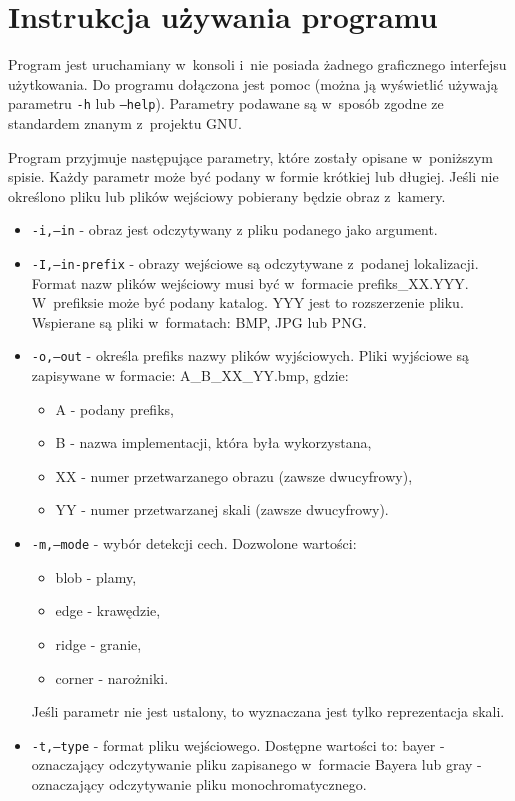 \chapter{Instrukcja używania programu}
\label{cha:instrukcja}

Program jest uruchamiany w~konsoli i~nie posiada żadnego graficznego interfejsu użytkowania. Do programu dołączona jest pomoc (można ją wyświetlić używają parametru \texttt{-h} lub \texttt{--help}). Parametry podawane są w~sposób zgodne ze standardem znanym z~projektu GNU.

Program przyjmuje następujące parametry, które zostały opisane w~poniższym spisie. Każdy parametr może być podany w formie krótkiej lub długiej. Jeśli nie określono pliku lub plików wejściowy pobierany będzie obraz z~kamery.

\begin{itemize}
\item \texttt{-i,--in} - obraz jest odczytywany z pliku podanego jako argument.
\item \texttt{-I,--in-prefix} - obrazy wejściowe są odczytywane z~podanej lokalizacji. Format nazw plików wejściowy musi być w~formacie prefiks\_XX.YYY. W~prefiksie może być podany katalog. YYY jest to rozszerzenie pliku. Wspierane są pliki w~formatach: BMP, JPG lub PNG.
\item \texttt{-o,--out} - określa prefiks nazwy plików wyjściowych. Pliki wyjściowe są zapisywane w formacie: A\_B\_XX\_YY.bmp, gdzie:
	\begin{itemize}
		\item A - podany prefiks,
		\item B - nazwa implementacji, która była wykorzystana,
		\item XX - numer przetwarzanego obrazu (zawsze dwucyfrowy),
		\item YY - numer przetwarzanej skali (zawsze dwucyfrowy).
	\end{itemize}
\item \texttt{-m,--mode} - wybór detekcji cech. Dozwolone wartości:
	\begin{itemize}
		\item blob - plamy,
		\item edge - krawędzie,
		\item ridge - granie,
		\item corner - narożniki.
	\end{itemize}
	Jeśli parametr nie jest ustalony, to wyznaczana jest tylko reprezentacja skali.
\item \texttt{-t,--type} - format pliku wejściowego. Dostępne wartości to: bayer - oznaczający odczytywanie pliku zapisanego w~formacie Bayera lub gray - oznaczający odczytywanie pliku monochromatycznego.

\end{itemize}
